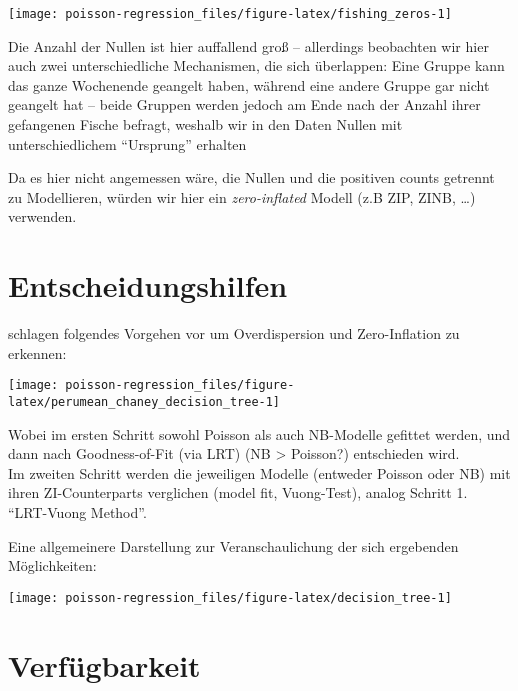 \documentclass[ngerman,a4paper,]{scrartcl}
\theoremstyle{definition}
\theoremstyle{definition}
\theoremstyle{definition}
\theoremstyle{remark}
\begin{document}
\begin{center}\texttt{[image: poisson-regression\_files/figure-latex/fishing\_zeros-1]} \end{center}

Die Anzahl der Nullen ist hier auffallend groß -- allerdings beobachten wir hier auch zwei unterschiedliche Mechanismen, die sich überlappen: Eine Gruppe kann das ganze Wochenende geangelt haben, während eine andere Gruppe gar nicht geangelt hat -- beide Gruppen werden jedoch am Ende nach der Anzahl ihrer gefangenen Fische befragt, weshalb wir in den Daten Nullen mit unterschiedlichem \enquote{Ursprung} erhalten

Da es hier nicht angemessen wäre, die Nullen und die positiven counts getrennt zu Modellieren, würden wir hier ein \emph{zero-inflated} Modell (z.B ZIP, ZINB, \ldots{}) verwenden.

\hypertarget{entscheidungshilfen}{%
\section{Entscheidungshilfen}\label{entscheidungshilfen}}

\citet{perumean-chaneyZeroinflatedOverdispersedWhat2013} schlagen folgendes Vorgehen vor um Overdispersion und Zero-Inflation zu erkennen:

\begin{center}\texttt{[image: poisson-regression\_files/figure-latex/perumean\_chaney\_decision\_tree-1]} \end{center}

Wobei im ersten Schritt sowohl Poisson als auch NB-Modelle gefittet werden, und dann nach Goodness-of-Fit (via LRT) (NB \textgreater{} Poisson?) entschieden wird.\\
Im zweiten Schritt werden die jeweiligen Modelle (entweder Poisson oder NB) mit ihren ZI-Counterparts verglichen (model fit, Vuong-Test), analog Schritt 1.\\
\enquote{LRT-Vuong Method}.

Eine allgemeinere Darstellung zur Veranschaulichung der sich ergebenden Möglichkeiten:

\begin{center}\texttt{[image: poisson-regression\_files/figure-latex/decision\_tree-1]} \end{center}

\hypertarget{appendix-appendix}{%
\appendix {}}


\hypertarget{verfuxfcgbarkeit}{%
\section{Verfügbarkeit}\label{verfuxfcgbarkeit}}
\end{document}
